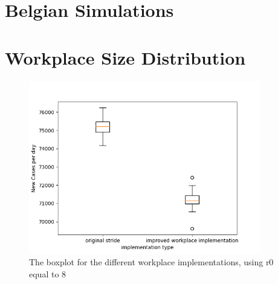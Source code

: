 \documentclass[runningheads]{llncs}
\begin{document}
	\section{Belgian Simulations}
	
	\newpage
	\appendix
	\appendixpage
	\section{Workplace Size Distribution}
	\begin{figure}
		\centering
		\includegraphics[width=0.9\textwidth]{workplace_r08_boxplot.png}	
		\caption{The boxplot for the different workplace implementations, using r0 equal to 8}
		\label{fig1}
	\end{figure}
\end{document}
